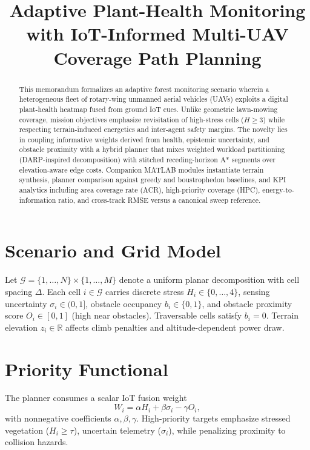 \documentclass[conference]{IEEEtran}
\begin{document}
\title{Adaptive Plant-Health Monitoring with IoT-Informed Multi-UAV Coverage Path Planning}

\author{
%
%
}

\maketitle

\begin{abstract}
This memorandum formalizes an adaptive forest monitoring scenario wherein a heterogeneous fleet of rotary-wing unmanned aerial vehicles (UAVs) exploits a digital plant-health heatmap fused from ground IoT cues. Unlike geometric lawn-mowing coverage, mission objectives emphasize revisitation of high-stress cells ($H \ge 3$) while respecting terrain-induced energetics and inter-agent safety margins. The novelty lies in coupling informative weights derived from health, epistemic uncertainty, and obstacle proximity with a hybrid planner that mixes weighted workload partitioning (DARP-inspired decomposition) with stitched receding-horizon A* segments over elevation-aware edge costs. Companion MATLAB modules instantiate terrain synthesis, planner comparison against greedy and boustrophedon baselines, and KPI analytics including area coverage rate (ACR), high-priority coverage (HPC), energy-to-information ratio, and cross-track RMSE versus a canonical sweep reference.
\end{abstract}

\section{Scenario and Grid Model}
Let $\mathcal{G}=\{1,\dots,N\}\times\{1,\dots,M\}$ denote a uniform planar decomposition with cell spacing $\Delta$. Each cell $i\in\mathcal{G}$ carries discrete stress $H_i\in\{0,\dots,4\}$, sensing uncertainty $\sigma_i\in(0,1]$, obstacle occupancy $b_i\in\{0,1\}$, and obstacle proximity score $O_i\in[0,1]$ (high near obstacles). Traversable cells satisfy $b_i=0$. Terrain elevation $z_i\in\mathbb{R}$ affects climb penalties and altitude-dependent power draw.

\section{Priority Functional}
The planner consumes a scalar IoT fusion weight
\begin{equation}
W_i = \alpha H_i + \beta \sigma_i - \gamma O_i,
\label{eq:weight}
\end{equation}
with nonnegative coefficients $\alpha,\beta,\gamma$. High-priority targets emphasize stressed vegetation ($H_i\ge \tau$), uncertain telemetry ($\sigma_i$), while penalizing proximity to collision hazards.
\end{document}
